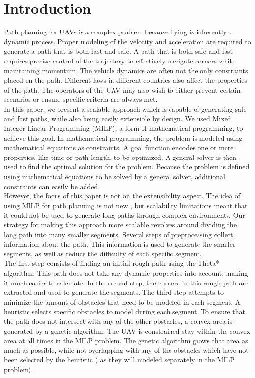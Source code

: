 \section{Introduction}
Path planning for UAVs is a complex problem because flying is inherently a dynamic process. Proper modeling of the velocity and acceleration are required to generate a path that is both fast and safe. A path that is both safe and fast requires precise control of the trajectory to effectively navigate corners while maintaining momentum. The vehicle dynamics are often not the only constraints placed on the path. Different laws in different countries also affect the properties of the path. The operators of the UAV may also wish to either prevent certain scenarios or ensure specific criteria are always met. \\
In this paper, we present a scalable approach which is capable of generating safe and fast paths, while also being easily extensible by design. We used Mixed Integer Linear Programming (MILP), a form of mathematical programming, to achieve this goal. In mathematical programming, the problem is modeled using mathematical equations as constraints. A goal function encodes one or more properties, like time or path length, to be optimized. A general solver is then used to find the optimal solution for the problem. Because the problem is defined using mathematical equations to be solved by a general solver, additional constraints can easily be added.\\
However, the focus of this paper is not on the extensibility aspect. The idea of using MILP for path planning is not new \cite{Schouwenaars2001}, but scalability limitations meant that it could not be used to generate long paths through complex environments. Our strategy for making this approach more scalable revolves around dividing the long path into many smaller segments. Several steps of preprocessing collect information about the path. This information is used to generate the smaller segments, as well as reduce the difficulty of each specific segment. \\
The first step consists of finding an initial rough path using the Theta* algorithm. This path does not take any dynamic properties into account, making it much easier to calculate. In the second step, the corners in this rough path are extracted and used to generate the segments. The third step attempts to minimize the amount of obstacles that need to be modeled in each segment. A heuristic selects specific obstacles to model during each segment. To ensure that the path does not intersect with any of the other obstacles, a convex area is generated by a genetic algorithm. The UAV is constrained stay within the convex area at all times in the MILP problem.  The genetic algorithm grows that area as much as possible, while not overlapping with any of the obstacles which have not been selected by the heuristic ( as they will modeled separately in the MILP problem).

